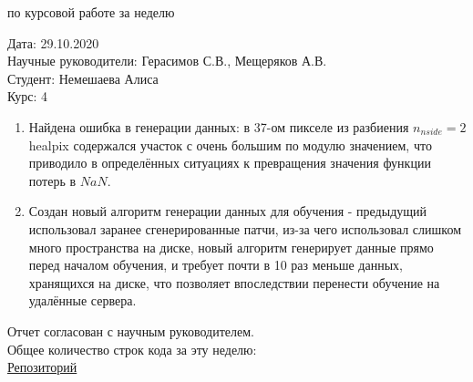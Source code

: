 \documentclass{article}
\begin{document}
\begin{center}{ по курсовой работе за неделю\\}\end{center}
Дата: 29.10.2020\\
Научные руководители: Герасимов С.В., Мещеряков А.В.\\
Студент: Немешаева Алиса\\
Курс: 4\\

\renewcommand{\labelitemi}{$\blacksquare$}
\renewcommand\labelitemii{$\square$}
\begin{enumerate}
    \item Найдена ошибка в генерации данных: в 37-ом пикселе из разбиения $n_{nside}=2$ healpix 
        содержался участок с очень большим по модулю значением, что приводило в определённых 
        ситуациях к превращения значения функции потерь в $NaN$.\\
    \item Создан новый алгоритм генерации данных для обучения - предыдущий использовал заранее 
        сгенерированные патчи, из-за чего использовал слишком много пространства на диске, новый 
        алгоритм генерирует данные прямо перед началом обучения, и требует почти в 10 раз меньше 
        данных, хранящихся на диске, что позволяет впоследствии перенести обучение на удалённые 
        сервера.\\
\end{enumerate}

Отчет согласован с научным руководителем.\\
Общее количество строк кода за эту неделю: \\
\hyperlink{https://github.com/rt2122/data-segmentation-2}{Репозиторий}\\ 
\end{document}
